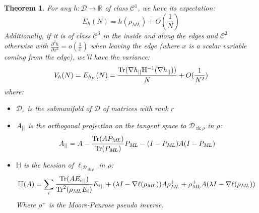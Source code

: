 \documentclass[10pt,a4paper]{report}
\theoremstyle{plain}
\newtheorem{thm}{Theorem}[chapter]
\theoremstyle{definition}
\theoremstyle{remark}
\newcommand{\R}{\ensuremath{\mathbb{R}}}
\newcommand{\dparn}[3]{\frac{\partial^{#3} {#1}}{\partial{#2}^{#3}}}
\DeclareMathOperator{\Tr}{Tr}
\DeclareMathOperator{\rk}{rk}
\newcommand{\class}[1]{{\mathscr{C}^{#1}}}
\newcommand{\ml}{_{M\!L}}
\begin{document}
\begin{thm}\label{thm:asymain}
  For any $h : \mathcal{D} \to \R$ of class $\class 1$,
  we have its expectation:
  \[E_h(N) = h(\rho\ml) + O\left(\frac 1N\right)\]
  Additionally, if it is of class $\class 3$ in the inside and along the edges
  and $\class 2$ otherwise with $\dparn h x 2 =
  o(\frac 1 x)$ when leaving the edge (where $x$ is a scalar variable coming from the
  edge), we'll have the variance:
  \[V_h(N) = E_{h_V}(N) = \frac{\Tr(\nabla h\pr \mathbb H\inv(\nabla h\pr))}N +O(\frac 1 {N^2})\]
  where:
\begin{itemize}
\item $\mathcal{D}_r$ is the submanifold of $\mathcal{D}$ of matrices with rank $r$
\item $A_{||}$ is
  the orthogonal projection on the tangent space to $\mathcal{D}_{\rk \rho}$ in
  $\rho$:
  \[A\pr = A - \frac{\Tr(AP\ml)}{\Tr(P\ml)}P\ml - (I-P\ml)A(I-P\ml)\]
\item $\mathbb H$ is the hessian of $\ell_{|\mathcal{D}_{\rk \rho}}$ in $\rho$:
  \[\mathbb{H}(A) = \sum_i \frac{\Tr(A{E_i}\pr)}{\Tr^2(\rho\ml E_i)} {E_i}\pr +
    (\lambda I - \nabla \ell(\rho\ml))A\rho\ml^+ +
    \rho\ml^+A(\lambda I - \nabla \ell(\rho\ml))\]
  Where $\rho^+$ is the Moore-Penrose pseudo inverse.
\end{itemize}

\end{thm}
\end{document}
